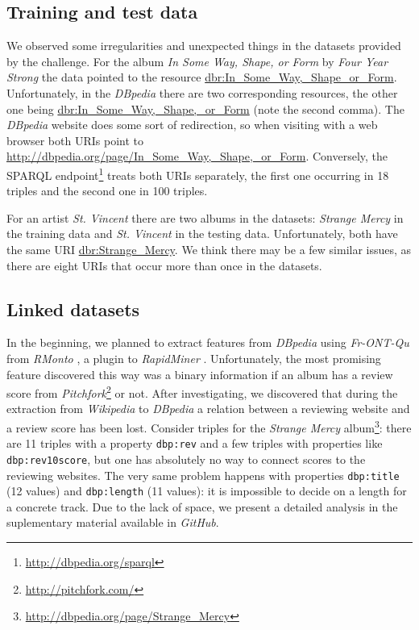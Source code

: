 \documentclass{llncs}
\begin{document}
\subsection{Training and test data}
We observed some irregularities and unexpected things in the datasets provided by the challenge.
For the album \emph{In Some Way, Shape, or Form} by \emph{Four Year Strong} the data pointed to the resource \url{dbr:In_Some_Way,_Shape_or_Form}.
Unfortunately, in the \emph{DBpedia} \cite{dbpedia} there are two corresponding resources, the other one being \url{dbr:In_Some_Way,_Shape,_or_Form} (note the second comma).
The \emph{DBpedia} website does some sort of redirection, so when visiting with a web browser both URIs point to \url{http://dbpedia.org/page/In_Some_Way,_Shape,_or_Form}.
Conversely, the SPARQL endpoint\footnote{\url{http://dbpedia.org/sparql}} treats both URIs separately, the first one occurring in 18 triples and the second one in 100 triples.

For an artist \emph{St. Vincent} there are two albums in the datasets: \emph{Strange Mercy} in the training data and \emph{St. Vincent} in the testing data.
Unfortunately, both have the same URI \url{dbr:Strange_Mercy}.
We think there may be a few similar issues, as there are eight URIs that occur more than once in the datasets.
%

\subsection{Linked datasets\label{sec:ld}}
In the beginning, we planned to extract features from \emph{DBpedia} using \emph{Fr-ONT-Qu} \cite{frontqu} from \emph{RMonto} \cite{rmonto}, a plugin to \emph{RapidMiner} \cite{rapidminer}.
Unfortunately, the most promising feature discovered this way was a binary information if an album has a review score from \emph{Pitchfork}\footnote{\url{http://pitchfork.com/}} or not.
After investigating, we discovered that during the extraction from \emph{Wikipedia} to \emph{DBpedia} a relation between a reviewing website and a review score has been lost.
Consider triples for the \emph{Strange Mercy} album\footnote{\url{http://dbpedia.org/page/Strange_Mercy}}: there are 11 triples with a property \texttt{dbp:rev} and a few triples with properties like \texttt{dbp:rev10score}, but one has absolutely no way to connect scores to the reviewing websites.
The very same problem happens with properties \texttt{dbp:title} (12 values) and \texttt{dbp:length} (11 values): it is impossible to decide on a length for a concrete track.
Due to the lack of space, we present a detailed analysis in the suplementary material available in \emph{GitHub}.
\end{document}
